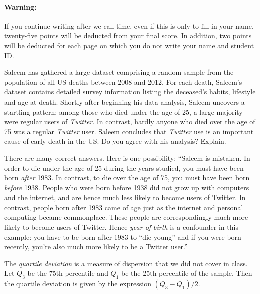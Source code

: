 \documentclass[addpoints,12pt]{exam}
\begin{document}
\paragraph{Warning:} If you continue writing after we call time, even if this is only to fill in your name, twenty-five points will be deducted from your final score. In addition, two points will be deducted for each page on which you do not write your name and student ID. \\

\newpage
\begin{questions}



\question[10] Saleem has gathered a large dataset comprising a random sample from the population of all US deaths between 2008 and 2012. For each death, Saleem's dataset contains detailed survey information listing the deceased's habits, lifestyle and age at death. Shortly after beginning his data analysis, Saleem uncovers a startling pattern: among those who died under the age of 25, a large majority were regular users of \emph{Twitter}. In contrast, hardly anyone who died over the age of 75 was a regular \emph{Twitter} user. Saleem concludes that \emph{Twitter} use is an important cause of early death in the US. Do you agree with his analysis? Explain.
	\begin{solution}[2.75in]
		There are many correct answers. Here is one possibility: ``Saleem is mistaken. In order to die under the age of 25 during the years studied, you must have been born \emph{after} 1983. In contrast, to die over the age of 75, you must have been born \emph{before} 1938. People who were born before 1938 did not grow up with computers and the internet, and are hence much less likely to become users of Twitter. In contrast, people born after 1983 came of age just as the internet and personal computing became commonplace. These people are correspondingly much more likely to become users of Twitter. Hence \emph{year of birth} is a confounder in this example: you have to be born after 1983 to ``die young'' and if you were born recently, you're also much more likely to be a Twitter user.''
	\end{solution}


\question The \emph{quartile deviation} is a measure of dispersion that we did not cover in class. Let $Q_3$ be the 75th percentile and $Q_1$ be the 25th percentile of the sample. Then the quartile deviation is given by the expression $(Q_3 - Q_1)/2$.
	\begin{parts}

\end{parts}
\end{questions}
\end{document}
